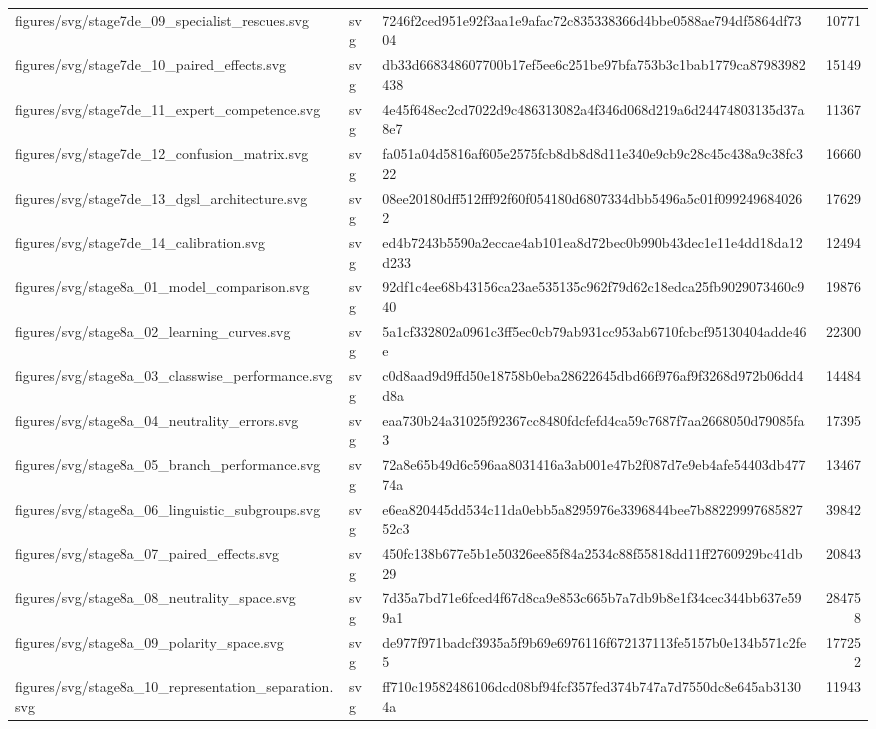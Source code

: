 \begin{tabular}{lllr}
figures/svg/stage7de_09_specialist_rescues.svg & svg & 7246f2ced951e92f3aa1e9afac72c835338366d4bbe0588ae794df5864df7304 & 10771 \\
figures/svg/stage7de_10_paired_effects.svg & svg & db33d668348607700b17ef5ee6c251be97bfa753b3c1bab1779ca87983982438 & 15149 \\
figures/svg/stage7de_11_expert_competence.svg & svg & 4e45f648ec2cd7022d9c486313082a4f346d068d219a6d24474803135d37a8e7 & 11367 \\
figures/svg/stage7de_12_confusion_matrix.svg & svg & fa051a04d5816af605e2575fcb8db8d8d11e340e9cb9c28c45c438a9c38fc322 & 16660 \\
figures/svg/stage7de_13_dgsl_architecture.svg & svg & 08ee20180dff512fff92f60f054180d6807334dbb5496a5c01f0992496840262 & 17629 \\
figures/svg/stage7de_14_calibration.svg & svg & ed4b7243b5590a2eccae4ab101ea8d72bec0b990b43dec1e11e4dd18da12d233 & 12494 \\
figures/svg/stage8a_01_model_comparison.svg & svg & 92df1c4ee68b43156ca23ae535135c962f79d62c18edca25fb9029073460c940 & 19876 \\
figures/svg/stage8a_02_learning_curves.svg & svg & 5a1cf332802a0961c3ff5ec0cb79ab931cc953ab6710fcbcf95130404adde46e & 22300 \\
figures/svg/stage8a_03_classwise_performance.svg & svg & c0d8aad9d9ffd50e18758b0eba28622645dbd66f976af9f3268d972b06dd4d8a & 14484 \\
figures/svg/stage8a_04_neutrality_errors.svg & svg & eaa730b24a31025f92367cc8480fdcfefd4ca59c7687f7aa2668050d79085fa3 & 17395 \\
figures/svg/stage8a_05_branch_performance.svg & svg & 72a8e65b49d6c596aa8031416a3ab001e47b2f087d7e9eb4afe54403db47774a & 13467 \\
figures/svg/stage8a_06_linguistic_subgroups.svg & svg & e6ea820445dd534c11da0ebb5a8295976e3396844bee7b8822999768582752c3 & 39842 \\
figures/svg/stage8a_07_paired_effects.svg & svg & 450fc138b677e5b1e50326ee85f84a2534c88f55818dd11ff2760929bc41db29 & 20843 \\
figures/svg/stage8a_08_neutrality_space.svg & svg & 7d35a7bd71e6fced4f67d8ca9e853c665b7a7db9b8e1f34cec344bb637e599a1 & 284758 \\
figures/svg/stage8a_09_polarity_space.svg & svg & de977f971badcf3935a5f9b69e6976116f672137113fe5157b0e134b571c2fe5 & 177252 \\
figures/svg/stage8a_10_representation_separation.svg & svg & ff710c19582486106dcd08bf94fcf357fed374b747a7d7550dc8e645ab31304a & 11943 \\

\end{tabular}
